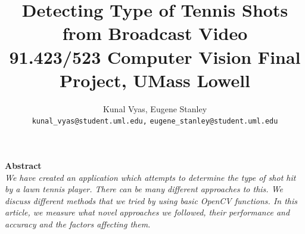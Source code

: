 \documentclass[10.5pt]{proc}
\begin{document}
\title{Detecting Type of Tennis Shots from Broadcast Video\\[5pt]
\small{91.423/523 Computer Vision Final Project, UMass Lowell}}
\author{Kunal Vyas, Eugene Stanley\\
  \texttt{kunal\_vyas@student.uml.edu,}
  \texttt{eugene\_stanley@student.uml.edu}}
  \date{\vspace{-1ex}}
  \maketitle
  
  \textbf{\large{Abstract}}\\[3pt]
  \emph{\normalsize{We have created an application which attempts to determine the type of shot hit by a lawn tennis player. There can be many different approaches to this. We discuss different methods that we tried by using basic OpenCV functions. In this article, we measure what novel approaches we followed, their performance and accuracy and the factors affecting them.}}
\end{document}

